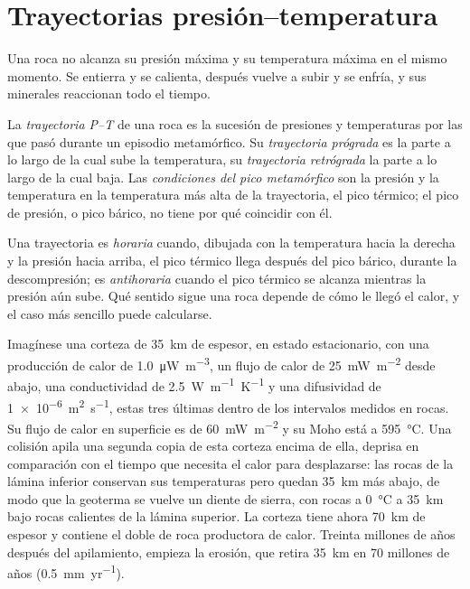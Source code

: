 \section{Trayectorias presión--temperatura}\label{sec:b2:pt-paths:paths}

Una roca no alcanza su presión máxima y su temperatura máxima en el mismo momento.
Se entierra y se calienta, después vuelve a subir y se enfría, y sus minerales reaccionan todo
el tiempo.

\begin{definition}\label{def:b2:pt-paths:paths}
La \emph{trayectoria P--T} de una roca es la sucesión de presiones y
temperaturas por las que pasó durante un episodio metamórfico. Su \emph{trayectoria
prógrada} es la parte a lo largo de la cual sube la temperatura, su \emph{trayectoria
retrógrada} la parte a lo largo de la cual baja. Las \emph{condiciones del pico
metamórfico} son la presión y la temperatura en la
temperatura más alta de la trayectoria, el pico térmico; el pico de presión, o pico bárico, no tiene
por qué coincidir con él.
\end{definition}

Una trayectoria es \emph{horaria} cuando, dibujada con la temperatura hacia la derecha y la presión hacia arriba,
el pico térmico llega después del pico bárico, durante la descompresión; es
\emph{antihoraria} cuando el pico térmico se alcanza mientras la presión aún sube. Qué
sentido sigue una roca depende de cómo le llegó el calor, y el caso más sencillo puede
calcularse.

Imagínese una corteza de \qty{35}{km} de espesor, en estado estacionario, con una producción de calor de
\qty{1.0}{\micro W.m^{-3}}, un flujo de calor de \qty{25}{mW.m^{-2}} desde abajo, una conductividad
de \qty{2.5}{W.m^{-1}.K^{-1}} y una difusividad de \qty{1e-6}{m^2.s^{-1}}, estas tres últimas
dentro de los intervalos medidos en rocas. Su flujo de calor en superficie es de \qty{60}{mW.m^{-2}} y su Moho está a
\qty{595}{\celsius}. Una colisión apila una segunda copia de esta corteza encima de ella, deprisa
en comparación con el tiempo que necesita el calor para desplazarse: las rocas de la lámina inferior conservan sus
temperaturas pero quedan \qty{35}{km} más abajo, de modo que la geoterma se vuelve un diente de sierra, con
rocas a \qty{0}{\celsius} a \qty{35}{km} bajo rocas calientes de la lámina superior. La corteza tiene
ahora \qty{70}{km} de espesor y contiene el doble de roca productora de calor. Treinta millones de años después
del apilamiento, empieza la erosión, que retira \qty{35}{km} en 70 millones de años
(\qty{0.5}{mm.yr^{-1}}).

